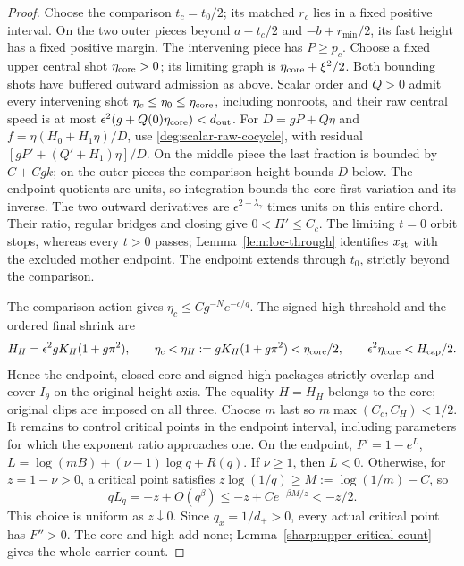 \begin{proof}
Choose the comparison \(t_c=t_0/2\); its matched \(r_c\) lies in a
fixed positive interval. On the two outer pieces beyond
\(a-t_c/2\) and \(-b+r_{\min}/2\), its fast height has a fixed
positive margin. The intervening piece has \(P\ge p_c\).
Choose a fixed upper central shot \(\eta_{\rm core}>0\); its limiting
graph is \(\eta_{\rm core}+\xi^2/2\). Both bounding shots have
buffered outward admission as above. Scalar order and \(Q>0\) admit
every intervening shot \(\eta_c\le\eta_0\le\eta_{\rm core}\),
including nonroots, and their raw central speed is at most
\(\epsilon^2(g+Q(0)\eta_{\rm core})<d_{\rm out}\).
For \(D=gP+Q\eta\) and \(f=\eta(H_0+H_1\eta)/D\),
use \eqref{deg:scalar-raw-cocycle}, with residual
\([gP'+(Q'+H_1)\eta]/D\).
On the middle piece the last fraction is bounded by
\(C+Cgk\); on the outer pieces the comparison height bounds
\(D\) below. The endpoint quotients are units, so integration bounds
the core first variation and its inverse. The two outward derivatives
are \(\epsilon^{2-\lambda_\gamma}\) times units on this entire
chord. Their ratio, regular bridges and closing give \(0<\Pi'\le C_c\).
The limiting \(t=0\) orbit stops, whereas every \(t>0\) passes;
Lemma~\ref{lem:loc-through} identifies \(x_{\rm st}\) with the
excluded mother endpoint. The endpoint extends through \(t_0\),
strictly beyond the comparison.

The comparison action gives \(\eta_c\le Cg^{-N}e^{-c/g}\). The
signed high threshold and the ordered final shrink are
\begin{equation}\label{deg:negative-gamma-cover}
 H_H=\epsilon^2gK_H(1+g\pi^2),\qquad
 \eta_c<\eta_H:=gK_H(1+g\pi^2)<\eta_{\rm core}/2,\qquad
 \epsilon^2\eta_{\rm core}<H_{\rm cap}/2.
\end{equation}
Hence the endpoint, closed core and signed high packages strictly overlap
and cover \(I_\theta\) on the original height axis. The equality
\(H=H_H\) belongs to the core; original clips are imposed on all
three. Choose \(m\) last so \(m\max(C_c,C_H)<1/2\).
It remains to control critical points in the endpoint interval,
including parameters for which the exponent ratio approaches one.
On the endpoint,
\(F'=1-e^L\), \(L=\log(mB)+(\nu-1)\log q+R(q)\).
If \(\nu\ge1\), then \(L<0\). Otherwise, for \(z=1-\nu>0\),
a critical point satisfies \(z\log(1/q)\ge M:=\log(1/m)-C\), so
\[
 qL_q=-z+O(q^\beta)\le-z+Ce^{-\beta M/z}<-z/2.
\]
This choice is uniform as \(z\downarrow0\). Since \(q_x=1/d_+>0\),
every actual critical point has \(F''>0\). The core and high add none;
Lemma~\ref{sharp:upper-critical-count} gives the whole-carrier count.
\end{proof}

